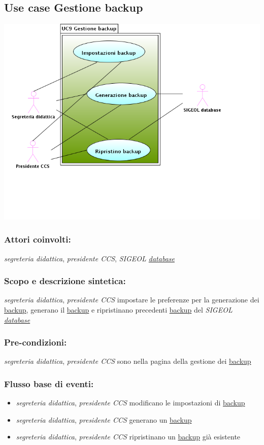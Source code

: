 \documentclass[11pt,a4paper]{article}
\begin{document}
\subsection{Use case Gestione backup}
\begin{center} 
 \includegraphics[scale=0.5]{images/UseCaseGestioneBackup.png}
\end{center}
\subsubsection*{Attori coinvolti:}
\textit{segreteria didattica}, \textit{presidente CCS}, \textit{SIGEOL \underline{database}}
\subsubsection*{Scopo e descrizione sintetica:}
\textit{segreteria didattica}, \textit{presidente CCS} impostare le preferenze per la generazione dei \underline{backup}, generano il \underline{backup} e ripristinano precedenti \underline{backup} del \textit{SIGEOL \underline{database}}
\subsubsection*{Pre-condizioni:}
\textit{segreteria didattica}, \textit{presidente CCS} sono nella pagina della gestione dei \underline{backup}
\subsubsection*{Flusso base di eventi:}
\begin{itemize}
 \item \textit{segreteria didattica}, \textit{presidente CCS} modificano le impostazioni di \underline{backup}
 \item \textit{segreteria didattica}, \textit{presidente CCS} generano un \underline{backup}
 \item \textit{segreteria didattica}, \textit{presidente CCS} ripristinano un \underline{backup} già esistente
\end{itemize}
\end{document}
